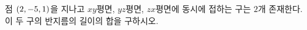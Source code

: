 점 $(2{,}\mkern3mu\mathopen{}-5{,}\mkern3mu\mathopen{}1)$을 지나고 $xy$평면, $yz$평면, $zx$평면에 동시에 접하는 구는 $2$개 존재한다. 이 두 구의 반지름의 길이의 합을 구하시오.
